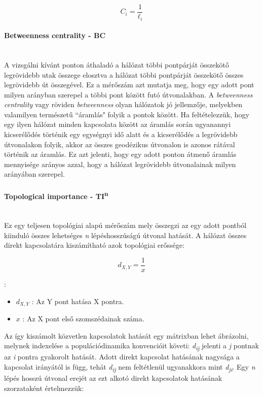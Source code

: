 \documentclass[a4paper,12pt]{article}
\begin{document}
	 	\begin{equation}
			C_i = \frac{1}{\ell_i}
	 	\end{equation}
	 
	 \paragraph{Betweenness centrality - BC} \mbox{}\\ 
	 A vizsgálni kívánt ponton áthaladó a hálózat többi pontpárját összekötő legrövidebb utak összege elosztva a hálózat többi pontpárját összekötő összes legrövidebb út összegével.  \cite{top_indexes} 	 Ez a mérőszám azt mutatja meg, hogy egy adott pont milyen arányban szerepel a többi pont között futó útvonalakban. A \textit{betweenness centrality} vagy röviden  \textit{betweenness} olyan hálózatok jó jellemzője, melyekben valamilyen természetű ``áramlás" folyik a pontok között. Ha feltételezzük, hogy egy ilyen hálózat minden kapcsolata között az áramlás során ugyanannyi kicserélődés történik egy egységnyi idő alatt és a kicserélődés a legrövidebb útvonalakon folyik, akkor az összes geodézikus útvonalon is azonos rátával történik az áramlás. Ez azt jelenti, hogy egy adott ponton átmenő áramlás mennyisége arányos azzal, hogy a hálózat legrövidebb útvonalainak milyen arányában szerepel. \cite{newman_networks}
	 
	 \paragraph{Topological importance - TI\textsuperscript{n}}  \mbox{}\\
	 Ez egy teljesen topológiai alapú mérőszám mely összegzi az egy adott pontból kiinduló összes lehetséges \textit{n} lépéshosszúságú útvonal hatását. A hálózat összes direkt kapcsolatára kiszámítható azok topológiai erőssége:
	 
	 \begin{equation}
		d_{X,Y} = \frac{1}{x}
	 \end{equation}
	 
 	 :
 	 \begin{itemize}[label=]
		 \item $d_{X,Y}$ : Az Y pont hatása X pontra.
		 \item $x$ : Az X pont első szomszédainak száma.
 	 \end{itemize}
	 
	 Az így kiszámolt közvetlen kapcsolatok hatását egy mátrixban lehet ábrázolni, melynek indexelése a populációdinamika konvencióit követi: \textit{d}\textsubscript{\textit{ij}} jelenti a \textit{j} pontnak az \textit{i} pontra gyakorolt hatását. Adott direkt kapcsolat hatásának nagysága a kapcsolat irányától is függ, tehát \textit{d}\textsubscript{\textit{ij}} nem feltétlenül ugyanakkora mint \textit{d}\textsubscript{\textit{ji}}. Egy \textit{n} lépés hosszú útvonal erejét az ezt alkotó direkt kapcsolatok hatásának szorzataként értelmezzük:
	 
\end{document}
